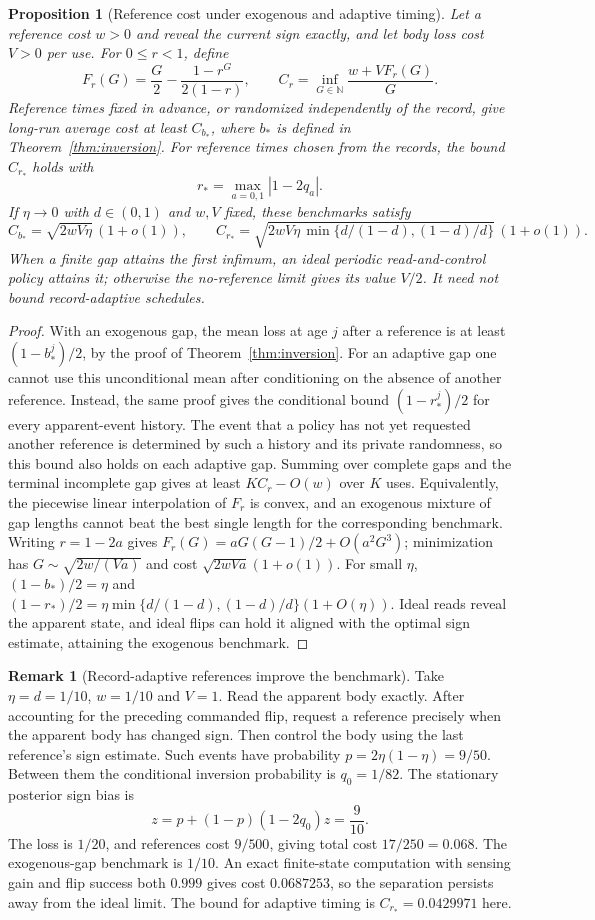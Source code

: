 \documentclass[12pt]{article}
\newtheorem{proposition}[theorem]{Proposition}
\theoremstyle{definition}
\newtheorem{remark}[theorem]{Remark}
\begin{document}
\begin{proposition}[Reference cost under exogenous and adaptive timing]
\label{prop:sqrtlaw}
Let a reference cost $w>0$ and reveal the current sign exactly, and let body
loss cost $V>0$ per use. For $0\le r<1$, define
\[
 F_r(G)=\frac G2-\frac{1-r^G}{2(1-r)},\qquad
 C_r=\inf_{G\in\mathbb N}\frac{w+VF_r(G)}G.
\]
Reference times fixed in advance, or randomized independently of the record,
give long-run average cost at least $C_{b_*}$, where $b_*$ is defined in
Theorem~\ref{thm:inversion}. For reference times chosen from the records,
the bound $C_{r_*}$ holds with
\[
 r_* = \max_{a=0,1}|1-2q_a|.
\]
If $\eta\to0$ with $d\in(0,1)$ and $w,V$ fixed, these benchmarks satisfy
\[
 C_{b_*}=\sqrt{2wV\eta}\,(1+o(1)),\qquad
 C_{r_*}=\sqrt{2wV\eta\,
       \min\{d/(1-d),(1-d)/d\}}\,(1+o(1)).
\]
When a finite gap attains the first infimum, an ideal periodic
read-and-control policy attains it; otherwise the no-reference limit
gives its value $V/2$. It need not bound record-adaptive schedules.
\end{proposition}
\begin{proof}
With an exogenous gap, the mean loss at age $j$ after a reference is at
least $(1-b_*^j)/2$, by the proof of Theorem~\ref{thm:inversion}.
For an adaptive gap one cannot use this unconditional mean after
conditioning on the absence of another reference. Instead, the same proof
gives the conditional bound $(1-r_*^j)/2$ for every apparent-event history.
The event that a policy has not yet requested another reference is determined
by such a history and its private randomness, so this bound also holds on
each adaptive gap. Summing over complete gaps and the terminal incomplete
gap gives at least $KC_r-O(w)$ over $K$ uses. Equivalently, the piecewise
linear interpolation of $F_r$ is convex, and an exogenous mixture of gap
lengths cannot beat the best single length for the corresponding benchmark.
Writing $r=1-2a$ gives
$F_r(G)=aG(G-1)/2+O(a^2G^3)$; minimization has
$G\sim\sqrt{2w/(Va)}$ and cost $\sqrt{2wVa}(1+o(1))$.
For small $\eta$, $(1-b_*)/2=\eta$ and
$(1-r_*)/2=\eta\min\{d/(1-d),(1-d)/d\}(1+O(\eta))$.
Ideal reads reveal the apparent state, and ideal flips can hold it aligned
with the optimal sign estimate, attaining the exogenous benchmark.
\end{proof}
\begin{remark}[Record-adaptive references improve the benchmark]
Take $\eta=d=1/10$, $w=1/10$ and $V=1$. Read the apparent body exactly.
After accounting for the preceding commanded flip, request a reference
precisely when the apparent body has changed sign. Then control the body
using the last reference's sign estimate. Such events have probability
$p=2\eta(1-\eta)=9/50$. Between them the conditional inversion probability
is $q_0=1/82$. The stationary posterior sign bias is
\[
 z=p+(1-p)(1-2q_0)z=\frac9{10}.
\]
The loss is $1/20$, and references cost $9/500$, giving total cost
$17/250=0.068$. The exogenous-gap benchmark is $1/10$.
An exact finite-state computation with sensing gain and flip success both
$0.999$ gives cost $0.0687253$, so the separation persists away from the ideal
limit. The bound for adaptive timing is $C_{r_*}=0.0429971$ here.
\end{remark}
\end{document}
